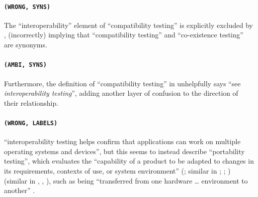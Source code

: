 \paragraph{\texttt{(WRONG, SYNS)}}
The ``interoperability'' element of ``compatibility testing'' is explicitly
excluded by \citet[p.~37]{IEEE2021c}, (incorrectly) implying that ``compatibility
testing'' and ``co-existence testing'' are synonyms.

\paragraph{\texttt{(AMBI, SYNS)}}
Furthermore, the definition of ``compatibility testing'' in
\citet[p.~43]{Kam2008} unhelpfully says ``see \emph{interoperability testing}'',
adding another layer of confusion to the direction of their relationship.

\paragraph{\texttt{(WRONG, LABELS)}}
 \citet[pp.~22, 43]{IEEE2022} 
``interoperability testing helps confirm that applications can work on multiple
operating systems and devices'', but this seems to instead describe
``portability testing'', which evaluates the ``capability of a product to be
adapted to changes in its requirements, contexts of use, or system environment''
\ifnotpaper
    (\citealp{ISO_IEC2023a}; similar in \citealp[p.~7]{IEEE2022};
    \citeyear[pp.~184, 329]{IEEE2017}; \citealpISTQB{})\else
    \cite{ISO_IEC2023a} (similar in \citeyear[pp.~184, 329]{IEEE2017},
    \citealp[p.~7]{IEEE2022}, \cite{ISTQB})\fi, such as being ``transferred
from one hardware \dots{} environment to another'' \citep[p.~39]{IEEE2021c}.
